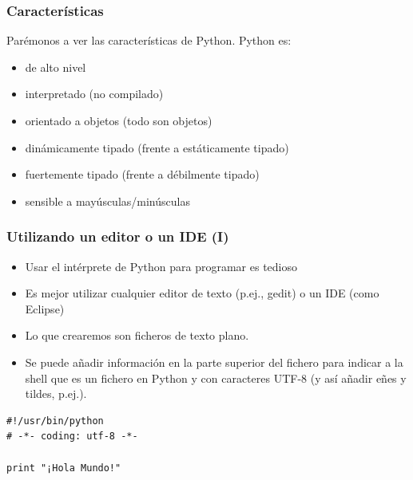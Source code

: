 \documentclass{beamer}
\begin{document}
\begin{frame}
\frametitle{Características}

Parémonos a ver las características de Python. Python es:
\begin{itemize}
\item de alto nivel
\item interpretado (no compilado)
\item orientado a objetos (todo son objetos)
\item dinámicamente tipado (frente a estáticamente tipado)
\item fuertemente tipado (frente a débilmente tipado)
\item sensible a mayúsculas/minúsculas
\end{itemize}

\end{frame}



\begin{frame}[fragile]
\frametitle{Utilizando un editor o un IDE (I)}

\begin{itemize}
  \item Usar el intérprete de Python para programar es tedioso
  \item Es mejor utilizar cualquier editor de texto (p.ej., gedit) o un IDE (como Eclipse)
  \item Lo que crearemos son ficheros de texto plano.
  \item Se puede añadir información en la parte superior del fichero para indicar a la shell que es un fichero en Python y con caracteres UTF-8 (y así añadir eñes y tildes, p.ej.).
\end{itemize}

\begin{footnotesize}
\begin{verbatim}
#!/usr/bin/python
# -*- coding: utf-8 -*-

print "¡Hola Mundo!"

\end{verbatim}
\end{footnotesize}

\end{frame}
\end{document}
